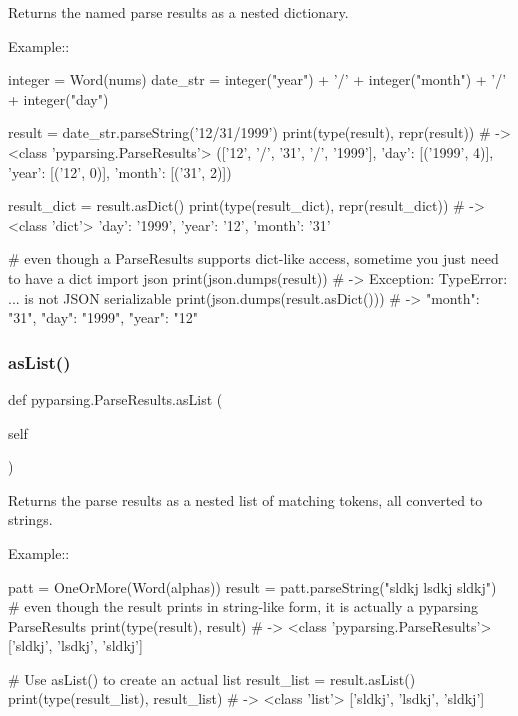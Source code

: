 \begin{DoxyVerb}Returns the named parse results as a nested dictionary.

Example::

    integer = Word(nums)
    date_str = integer("year") + '/' + integer("month") + '/' + integer("day")

    result = date_str.parseString('12/31/1999')
    print(type(result), repr(result)) # -> <class 'pyparsing.ParseResults'> (['12', '/', '31', '/', '1999'], {'day': [('1999', 4)], 'year': [('12', 0)], 'month': [('31', 2)]})

    result_dict = result.asDict()
    print(type(result_dict), repr(result_dict)) # -> <class 'dict'> {'day': '1999', 'year': '12', 'month': '31'}

    # even though a ParseResults supports dict-like access, sometime you just need to have a dict
    import json
    print(json.dumps(result)) # -> Exception: TypeError: ... is not JSON serializable
    print(json.dumps(result.asDict())) # -> {"month": "31", "day": "1999", "year": "12"}
\end{DoxyVerb}
 \mbox{\label{classpyparsing_1_1ParseResults_a5c0bd2157d26ad4c82e2626f87d24962}} 
\subsubsection{\texorpdfstring{as\+List()}{asList()}}
{\footnotesize\ttfamily def pyparsing.\+Parse\+Results.\+as\+List (\begin{DoxyParamCaption}\item[{}]{self }\end{DoxyParamCaption})}

\begin{DoxyVerb}Returns the parse results as a nested list of matching tokens, all converted to strings.

Example::

    patt = OneOrMore(Word(alphas))
    result = patt.parseString("sldkj lsdkj sldkj")
    # even though the result prints in string-like form, it is actually a pyparsing ParseResults
    print(type(result), result) # -> <class 'pyparsing.ParseResults'> ['sldkj', 'lsdkj', 'sldkj']

    # Use asList() to create an actual list
    result_list = result.asList()
    print(type(result_list), result_list) # -> <class 'list'> ['sldkj', 'lsdkj', 'sldkj']
\end{DoxyVerb}
 \mbox{\label{classpyparsing_1_1ParseResults_aa12b73c0fa41b26c71a66de1532704d7}} 
